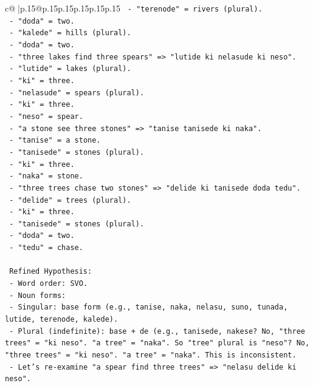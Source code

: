 \documentclass{article}
\begin{document}
{\begin{supertabular}{c@{$\;$}|p{.15\linewidth}@{}p{.15\linewidth}p{.15\linewidth}p{.15\linewidth}p{.15\linewidth}p{.15\linewidth}}
{{{\texttt{       {-} "terenode" = rivers (plural).} \\
\texttt{       {-} "doda" = two.} \\
\texttt{       {-} "kalede" = hills (plural).} \\
\texttt{       {-} "doda" = two.} \\
\texttt{     {-} "three lakes find three spears" => "lutide ki nelasude ki neso".} \\
\texttt{       {-} "lutide" = lakes (plural).} \\
\texttt{       {-} "ki" = three.} \\
\texttt{       {-} "nelasude" = spears (plural).} \\
\texttt{       {-} "ki" = three.} \\
\texttt{       {-} "neso" = spear.} \\
\texttt{     {-} "a stone see three stones" => "tanise tanisede ki naka".} \\
\texttt{       {-} "tanise" = a stone.} \\
\texttt{       {-} "tanisede" = stones (plural).} \\
\texttt{       {-} "ki" = three.} \\
\texttt{       {-} "naka" = stone.} \\
\texttt{     {-} "three trees chase two stones" => "delide ki tanisede doda tedu".} \\
\texttt{       {-} "delide" = trees (plural).} \\
\texttt{       {-} "ki" = three.} \\
\texttt{       {-} "tanisede" = stones (plural).} \\
\texttt{       {-} "doda" = two.} \\
\texttt{       {-} "tedu" = chase.} \\
\\ 
\texttt{   Refined Hypothesis:} \\
\texttt{   {-} Word order: SVO.} \\
\texttt{   {-} Noun forms:} \\
\texttt{     {-} Singular: base form (e.g., tanise, naka, nelasu, suno, tunada, lutide, terenode, kalede).} \\
\texttt{     {-} Plural (indefinite): base + de (e.g., tanisede, nakese? No, "three trees" = "ki neso". "a tree" = "naka". So "tree" plural is "neso"? No, "three trees" = "ki neso". "a tree" = "naka". This is inconsistent.} \\
\texttt{     {-} Let's re{-}examine "a spear find three trees" => "nelasu delide ki neso".} \\
}}}
\end{supertabular}}
\end{document}
